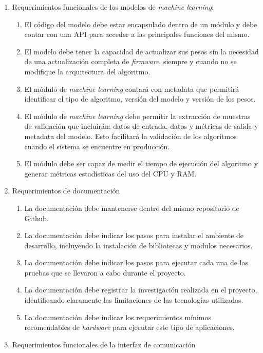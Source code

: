 \documentclass[
11pt, %
codirector, %
]{charter}
\begin{document}
\begin{enumerate}
	\item Requerimientos funcionales de los modelos de \textit{machine learning}: 
		\begin{enumerate}
			\item El código del modelo debe estar encapsulado dentro de un módulo y debe contar con una API para acceder a las principales funciones del mismo.
			\item El modelo debe tener la capacidad de actualizar sus pesos sin la necesidad de una actualización completa de \textit{firmware}, siempre y cuando no se modifique la arquitectura del algoritmo.
			\item El módulo de \textit{machine learning} contará con metadata que permitirá identificar el tipo de algoritmo, versión del modelo y versión de los pesos.
			\item El módulo de \textit{machine learning} debe permitir la extracción de muestras de validación que incluirán: datos de entrada, datos y métricas de salida y metadata del modelo. Esto facilitará la validación de los algoritmos cuando el sistema se encuentre en producción.
			\item El módulo debe ser capaz de medir el tiempo de ejecución del algoritmo y generar métricas estadísticas del uso del CPU y RAM.
		\end{enumerate}
	\item Requerimientos de documentación
		\begin{enumerate}
			\item La documentación debe mantenerse dentro del mismo repositorio de Github.
			\item La documentación debe indicar los pasos para instalar el ambiente de desarrollo, incluyendo la instalación de bibliotecas y módulos necesarios.
			\item La documentación debe indicar los pasos para ejecutar cada una de las pruebas que se llevaron a cabo durante el proyecto.
			\item La documentación debe registrar la investigación realizada en el proyecto, identificando claramente las limitaciones de las tecnologías utilizadas.
			\item La documentación debe indicar los requerimientos mínimos recomendables de \textit{hardware} para ejecutar este tipo de aplicaciones.
		\end{enumerate}
	\item Requerimientos funcionales de la interfaz de comunicación
		\begin{enumerate}

\end{enumerate}
\end{enumerate}
\end{document}
